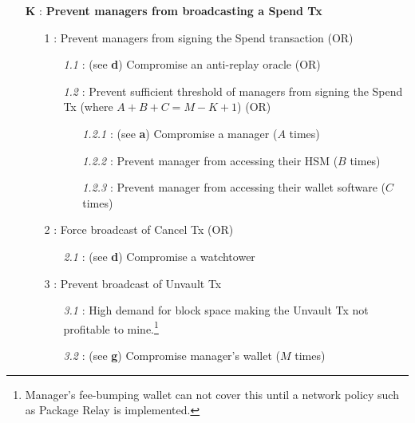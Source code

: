 \documentclass[runningheads]{llncs}
\begin{document}
{\footnotesize
\begin{itemize}[noitemsep,parsep=0pt,partopsep=0pt, leftmargin=0.7cm]
\item[\textbf{K} :] \textbf{Prevent managers from broadcasting a Spend Tx}
\begin{itemize}[noitemsep,topsep=0pt,parsep=0pt,partopsep=0pt, leftmargin=0.8cm]
\item[1 :] Prevent managers from signing the Spend transaction (OR)
\begin{itemize}[noitemsep,topsep=0pt,parsep=0pt,partopsep=0pt, leftmargin=0.9cm]
\item[\textit{1.1} :] (see \textbf{d}) Compromise an anti-replay oracle (OR)
\item[\textit{1.2} :] Prevent sufficient threshold of managers from signing the Spend Tx
(where $A + B + C = M-K+1$) (OR) 
\begin{itemize}[noitemsep,topsep=0pt,parsep=0pt,partopsep=0pt, leftmargin=1cm]
\item[\textit{1.2.1} :] (see \textbf{a}) Compromise a manager ($A$ times)
\item[\textit{1.2.2} :] Prevent manager from accessing their HSM ($B$ times)
\item[\textit{1.2.3} :] Prevent manager from accessing their wallet software ($C$ times)
\end{itemize}
\end{itemize}
\item[2 :] Force broadcast of Cancel Tx (OR)
\begin{itemize}[noitemsep,topsep=0pt,parsep=0pt,partopsep=0pt, leftmargin=0.9cm]
\item[\textit{2.1} :] (see \textbf{d}) Compromise a watchtower 
\end{itemize}
\item[3 :] Prevent broadcast of Unvault Tx
\begin{itemize}[noitemsep,topsep=0pt,parsep=0pt,partopsep=0pt, leftmargin=0.8cm]
\item[\textit{3.1} :] High demand for block space making the Unvault Tx not profitable to mine.\footnote{Manager's fee-bumping wallet can not cover this until a network policy such as Package Relay \cite{PackageRelay} is implemented.} %
\item[\textit{3.2} :] (see \textbf{g}) Compromise manager's wallet ($M$ times)
\end{itemize}
\end{itemize}
\end{itemize}
 }
\end{document}
